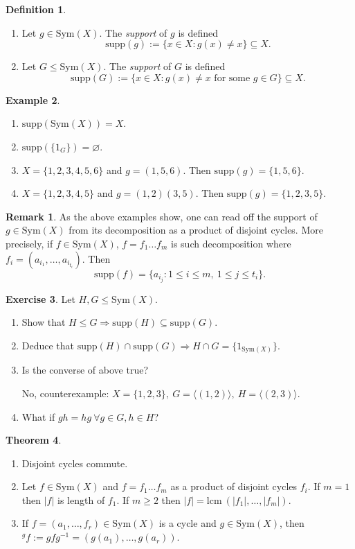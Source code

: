\documentclass[a4paper]{article}
\newcommand{\Sym}{\text{Sym}}
\newcommand{\supp}{\text{supp}}
\newcommand{\lcm}{\text{lcm}\ }
\theoremstyle{definition}
\newtheorem{defn}{Definition}[subsection]
\newtheorem{thm}[defn]{Theorem}
\newtheorem{example}[defn]{Example}
\newtheorem{exe}[defn]{Exercise}
\newtheorem*{remark}{Remark}
\begin{document}
\begin{defn}
\begin{enumerate}
\item Let $g\in\Sym(X)$. The \textit{support} of $g$ is defined
\[
\supp(g):=\{x\in X:g(x)\neq x\} \subseteq X.
\]
\item Let $G\leq \Sym(X)$. The \textit{support} of $G$ is defined
\[
\supp(G):=\{x\in X:g(x)\neq x\text{ for some }g\in G\} \subseteq X.
\]
\end{enumerate}
\end{defn}
\begin{example}
\begin{enumerate}
\item $\supp(\Sym(X))=X$.
\item $\supp(\{1_G\})=\varnothing$.
\item $X=\{1,2,3,4,5,6\}$ and $g=(1,5,6)$. Then $\supp(g)=\{1,5,6\}$.
\item $X=\{1,2,3,4,5\}$ and $g=(1,2)(3,5)$. Then $\supp(g)=\{1,2,3,5\}$.
\end{enumerate}
\end{example}
\begin{remark}
As the above examples show, one can read off the support of $g\in\Sym(X)$ from its decomposition as a product of disjoint cycles. More precisely, if $f\in\Sym(X)$, $f=f_1\ldots f_m$ is such decomposition where $f_i=\left(a_{i_1},\ldots,a_{i_{t_i}}\right)$. Then
\[
\supp(f)=\{a_{i_j} : 1\leq i\leq m, \ 1\leq j \leq t_i\}.
\]
\end{remark}
\begin{exe}
Let $H,G\leq \Sym(X)$.
\begin{enumerate}
\item Show that $H\leq G\Rightarrow\supp(H)\subseteq\supp(G)$.
\item Deduce that $\supp(H)\cap\supp(G)\Rightarrow H\cap G =\{1_{\Sym(X)}\}$.
\item Is the converse of above true?

No, counterexample: $X=\{1,2,3\},\ G=\langle(1,2)\rangle,\ H=\langle(2,3)\rangle$.
\item What if $gh=hg \ \forall g\in G,h\in H$?
\end{enumerate}
\end{exe}

\begin{thm}
\label{thm:disjointcycle}
\begin{enumerate}
\item Disjoint cycles commute.
\item Let $f\in\Sym(X)$ and $f=f_1\ldots f_m$ as a product of disjoint cycles $f_i$. If $m=1$ then $|f|$ is length of $f_1$. If $m\geq 2$ then $|f|=\lcm (|f_1|,\ldots,|f_m|)$.
\item If $f=(a_1,\ldots,f_r)\in\Sym(X)$ is a cycle and $g\in\Sym(X)$, then $^gf:=gfg^{-1}=\left(g(a_1),\ldots,g(a_r)\right)$.
\end{enumerate}
\end{thm}
\end{document}
